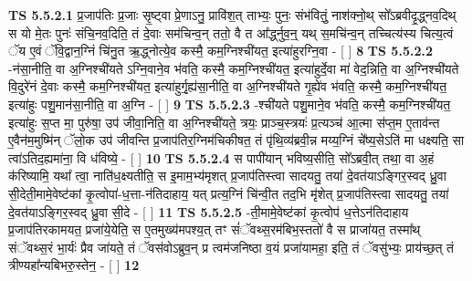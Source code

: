 \documentclass[17pt]{extarticle}
\begin{document}
                                        \textbf{ TS 5.5.2.1} \newline
                  प्र॒जाप॑तिः प्र॒जाः सृ॒ष्ट्वा प्रे॒णाऽनु॒ प्रावि॑श॒त् ताभ्यः॒ पुनः॒ संभ॑वितुं॒ नाश॑क्नो॒थ् सो᳚ऽब्रवीदृ॒द्ध्नव॒दिथ् स यो मे॒तः पुनः॑ संचि॒नव॒दिति॒ तं दे॒वाः सम॑चिन्व॒न् ततो॒ वै त आ᳚र्द्ध्नुव॒न्॒ यथ् स॒मचि॑न्व॒न् तच्चित्य॑स्य चित्य॒त्वं ॅय ए॒वं ॅवि॒द्वान॒ग्निं चि॑नु॒त ऋ॒द्ध्नोत्ये॒व कस्मै॒ कम॒ग्निश्ची॑यत॒ इत्या॑हुरग्नि॒वा - [  ] \textbf{  8} \newline
                  \newline
                                \textbf{ TS 5.5.2.2} \newline
                  -न॑सा॒नीति॒ वा अ॒ग्निश्ची॑यते ऽग्नि॒वाने॒व भ॑वति॒ कस्मै॒ कम॒ग्निश्ची॑यत॒ इत्या॑हुर्दे॒वा मा॑ वेद॒न्निति॒ वा अ॒ग्निश्ची॑यते वि॒दुरे॑नं दे॒वाः कस्मै॒ कम॒ग्निश्ची॑यत॒ इत्या॑हुर्गृ॒ह्य॑सा॒नीति॒ वा अ॒ग्निश्ची॑यते गृ॒ह्ये॑व भ॑वति॒ कस्मै॒ कम॒ग्निश्ची॑यत॒ इत्या॑हुः पशु॒मान॑सा॒नीति॒ वा अ॒ग्नि - [  ] \textbf{  9} \newline
                  \newline
                                \textbf{ TS 5.5.2.3} \newline
                  -श्ची॑यते पशु॒माने॒व भ॑वति॒ कस्मै॒ कम॒ग्निश्ची॑यत॒ इत्या॑हुः स॒प्त मा॒ पुरु॑षा॒ उप॑ जीवा॒निति॒ वा अ॒ग्निश्ची॑यते॒ त्रयः॒ प्राञ्च॒स्त्रयः॑ प्र॒त्यञ्च॑ आ॒त्मा स॑प्त॒म ए॒ताव॑न्त ए॒वैन॑म॒मुष्मि॑न् ॅलो॒क उप॑ जीवन्ति प्र॒जाप॑तिर॒ग्निम॑चिकीषत॒ तं पृ॑थि॒व्य॑ब्रवी॒न्न मय्य॒ग्निं चे᳚ष्य॒सेऽति॑ मा धक्ष्यति॒ सा त्वा॑ऽतिद॒ह्यमा॑ना॒ वि ध॑विष्ये॒ - [  ] \textbf{  10} \newline
                  \newline
                                \textbf{ TS 5.5.2.4} \newline
                  स पापी॑यान् भविष्य॒सीति॒ सो᳚ऽब्रवी॒त् तथा॒ वा अ॒हं क॑रिष्यामि॒ यथा᳚ त्वा॒ नाति॑ध॒क्ष्यतीति॒ स इ॒माम॒भ्य॑मृशत् प्र॒जाप॑तिस्त्वा सादयतु॒ तया॑ दे॒वत॑याऽङ्गिर॒स्वद् ध्रु॒वा सी॒देती॒मामे॒वेष्ट॑कां कृ॒त्वोपा॑-ध॒त्ता-न॑तिदाहाय॒ यत् प्रत्य॒ग्निं चि॑न्वी॒त तद॒भि मृ॑शेत् प्र॒जाप॑तिस्त्वा सादयतु॒ तया॑ दे॒वत॑याऽङ्गिर॒स्वद् ध्रु॒वा सी॒दे - [  ] \textbf{  11} \newline
                  \newline
                                \textbf{ TS 5.5.2.5} \newline
                  -ती॒मामे॒वेष्ट॑कां कृ॒त्वोप॑ ध॒त्तेऽन॑तिदाहाय प्र॒जाप॑तिरकामयत॒ प्रजा॑ये॒येति॒ स ए॒तमुख्य॑मपश्य॒त् तꣳ सं॑ॅवथ्स॒रम॑बिभ॒स्ततो॑ वै स प्राजा॑यत॒ तस्मा᳚थ् संॅवथ्स॒रं भा॒र्यः॑ प्रैव जा॑यते॒ तं ॅवस॑वोऽब्रुव॒न् प्र त्वम॑जनिष्ठा व॒यं प्रजा॑यामहा॒ इति॒ तं ॅवसु॑भ्यः॒ प्राय॑च्छ॒त् तं त्रीण्यहा᳚न्यबिभरु॒स्तेन॒ - [  ] \textbf{  12} \newline
\end{document}
